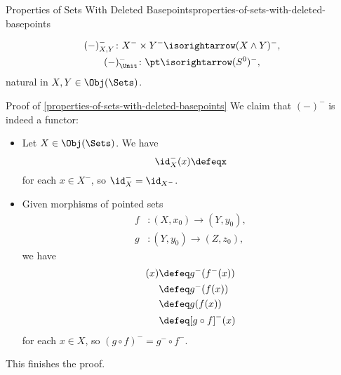 \begin{proposition}{Properties of Sets With Deleted Basepoints}{properties-of-sets-with-deleted-basepoints}
\begin{enumerate}
            \[
                \begin{gathered}
                    (-)^{-}_{X,Y}   \colon X^{-}\times Y^{-} \isorightarrow (X\wedge Y)^{-},\\
                    (-)^{-}_{\Unit} \colon \pt               \isorightarrow (S^{0})^{-},
                \end{gathered}
            \]%
            natural in $X,Y\in\Obj(\Sets)$.
    \end{enumerate}
\end{proposition}
\begin{Proof}{Proof of \cref{properties-of-sets-with-deleted-basepoints}}%
    We claim that $(-)^{-}$ is indeed a functor:
    \begin{itemize}
        \item{}Let $X\in\Obj(\Sets)$. We have
            \[
                \id^{-}_{X}(x)%
                \defeq%
                x
            \]%
            for each $x\in X^{-}$, so $\id^{-}_{X}=\id_{X^{-}}$.
        \item{}Given morphisms of pointed sets
            \begin{align*}
                f &\colon (X,x_{0}) \to (Y,y_{0}),\\
                g &\colon (Y,y_{0}) \to (Z,z_{0}),
            \end{align*}
            we have
            \begin{align*}
                [g^{-}\circ f^{-}](x) &\defeq g^{-}(f^{-}(x))\\
                                      &\defeq g^{-}(f(x))\\
                                      &\defeq g(f(x))\\
                                      &\defeq [g\circ f]^{-}(x)%
            \end{align*}
            for each $x\in X$, so $(g\circ f)^{-}=g^{-}\circ f^{-}$.
    \end{itemize}
    This finishes the proof.


\end{Proof}
